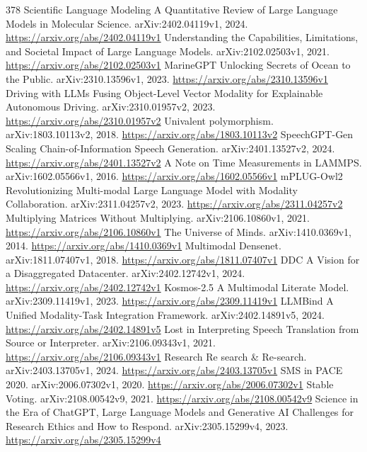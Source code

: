 \documentclass[11pt]{article}
\begin{document}
\begin{thebibliography}{378}
 Scientific Language Modeling A Quantitative Review of Large Language Models in Molecular Science. arXiv:2402.04119v1, 2024. \url{https://arxiv.org/abs/2402.04119v1}
 Understanding the Capabilities, Limitations, and Societal Impact of Large Language Models. arXiv:2102.02503v1, 2021. \url{https://arxiv.org/abs/2102.02503v1}
 MarineGPT Unlocking Secrets of Ocean to the Public. arXiv:2310.13596v1, 2023. \url{https://arxiv.org/abs/2310.13596v1}
 Driving with LLMs Fusing Object-Level Vector Modality for Explainable Autonomous Driving. arXiv:2310.01957v2, 2023. \url{https://arxiv.org/abs/2310.01957v2}
 Univalent polymorphism. arXiv:1803.10113v2, 2018. \url{https://arxiv.org/abs/1803.10113v2}
 SpeechGPT-Gen Scaling Chain-of-Information Speech Generation. arXiv:2401.13527v2, 2024. \url{https://arxiv.org/abs/2401.13527v2}
 A Note on Time Measurements in LAMMPS. arXiv:1602.05566v1, 2016. \url{https://arxiv.org/abs/1602.05566v1}
 mPLUG-Owl2 Revolutionizing Multi-modal Large Language Model with Modality Collaboration. arXiv:2311.04257v2, 2023. \url{https://arxiv.org/abs/2311.04257v2}
 Multiplying Matrices Without Multiplying. arXiv:2106.10860v1, 2021. \url{https://arxiv.org/abs/2106.10860v1}
 The Universe of Minds. arXiv:1410.0369v1, 2014. \url{https://arxiv.org/abs/1410.0369v1}
 Multimodal Densenet. arXiv:1811.07407v1, 2018. \url{https://arxiv.org/abs/1811.07407v1}
 DDC A Vision for a Disaggregated Datacenter. arXiv:2402.12742v1, 2024. \url{https://arxiv.org/abs/2402.12742v1}
 Kosmos-2.5 A Multimodal Literate Model. arXiv:2309.11419v1, 2023. \url{https://arxiv.org/abs/2309.11419v1}
 LLMBind A Unified Modality-Task Integration Framework. arXiv:2402.14891v5, 2024. \url{https://arxiv.org/abs/2402.14891v5}
 Lost in Interpreting Speech Translation from Source or Interpreter. arXiv:2106.09343v1, 2021. \url{https://arxiv.org/abs/2106.09343v1}
 Research Re search \& Re-search. arXiv:2403.13705v1, 2024. \url{https://arxiv.org/abs/2403.13705v1}
 SMS in PACE 2020. arXiv:2006.07302v1, 2020. \url{https://arxiv.org/abs/2006.07302v1}
 Stable Voting. arXiv:2108.00542v9, 2021. \url{https://arxiv.org/abs/2108.00542v9}
 Science in the Era of ChatGPT, Large Language Models and Generative AI Challenges for Research Ethics and How to Respond. arXiv:2305.15299v4, 2023. \url{https://arxiv.org/abs/2305.15299v4}

\end{thebibliography}
\end{document}
